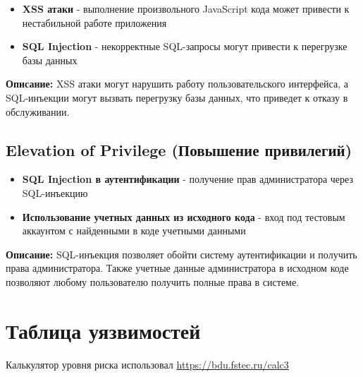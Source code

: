 \documentclass{article}
\begin{document}
\begin{itemize}
    \item \textbf{XSS атаки} - выполнение произвольного JavaScript кода может привести к нестабильной работе приложения
    \item \textbf{SQL Injection} - некорректные SQL-запросы могут привести к перегрузке базы данных
\end{itemize}

\textbf{Описание:} XSS атаки могут нарушить работу пользовательского интерфейса, а SQL-инъекции могут вызвать перегрузку базы данных, что приведет к отказу в обслуживании.

\subsection{Elevation of Privilege (Повышение привилегий)}

\begin{itemize}
    \item \textbf{SQL Injection в аутентификации} - получение прав администратора через SQL-инъекцию
    \item \textbf{Использование учетных данных из исходного кода} - вход под тестовым аккаунтом с найденными в коде учетными данными
\end{itemize}

\textbf{Описание:} SQL-инъекция позволяет обойти систему аутентификации и получить права администратора. Также учетные данные администратора в исходном коде позволяют любому пользователю получить полные права в системе.

\section{Таблица уязвимостей}

Калькулятор уровня риска использовал \href{https://bdu.fstec.ru/calc3}{https://bdu.fstec.ru/calc3}
\end{document}

